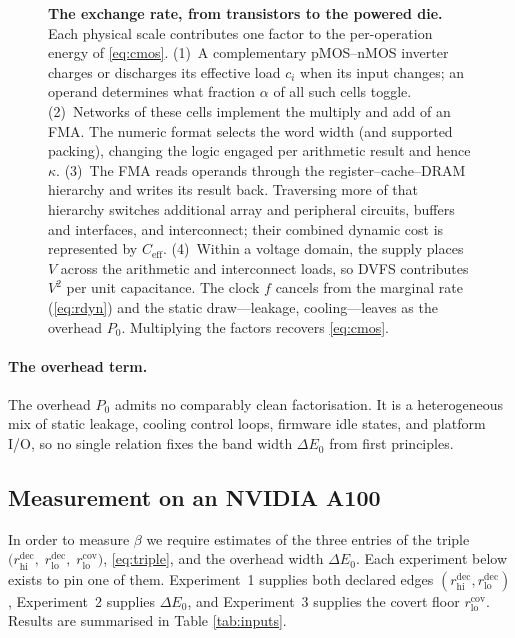 \documentclass{article}
\theoremstyle{plain}
\theoremstyle{definition}
\theoremstyle{remark}
\begin{document}
\begin{figure}[t]
{\begin{tikzpicture}
	\end{tikzpicture}%
	}
	\caption{\textbf{The exchange rate, from transistors to the powered die.}
		Each physical scale contributes one factor to the per-operation energy of
		\cref{eq:cmos}. (1)~A complementary pMOS--nMOS inverter charges or discharges
		its effective load \(c_i\) when its input changes; an operand determines
		what fraction \(\alpha\) of all such cells toggle. (2)~Networks of these
		cells implement the multiply and add of an FMA. The numeric format selects
		the word width (and supported packing), changing the logic engaged per
		arithmetic result and hence \(\kappa\). (3)~The FMA reads operands through
		the register--cache--DRAM hierarchy and writes its result back. Traversing
		more of that hierarchy switches additional array and peripheral circuits,
		buffers and interfaces, and interconnect; their combined dynamic cost is
		represented by \(C_{\mathrm{eff}}\). (4)~Within a voltage domain, the supply places
		\(V\) across the arithmetic and interconnect loads, so DVFS contributes
		\(V^2\) per unit capacitance. The
		clock \(f\) cancels from the marginal rate (\cref{eq:rdyn}) and the static
		draw---leakage, cooling---leaves as the overhead \(P_0\).
		Multiplying the factors recovers \cref{eq:cmos}.}
	\label{fig:exchange-scales}
\end{figure}

\paragraph{The overhead term.}
The overhead $P_0$ admits no comparably
clean factorisation. It is a
heterogeneous mix of static leakage, cooling control loops, firmware idle states,
and platform I/O, so no single relation fixes the band width $\Delta E_0$ from
first principles.

\subsection{Measurement on an NVIDIA A100}
\label{sec:empirical-measurements}
In order to measure $\beta$ we require estimates of the three entries of the triple $	\bigl(r_{\mathrm{hi}}^{\mathrm{dec}},\;r_{\mathrm{lo}}^{\mathrm{dec}},\;
	r_{\mathrm{lo}}^{\mathrm{cov}}\bigr)$, 
\cref{eq:triple}, and the overhead width $\Delta E_0$. Each experiment below
exists to pin one of them. Experiment~1 supplies both declared edges
$(r_{\mathrm{hi}}^{\mathrm{dec}}, r_{\mathrm{lo}}^{\mathrm{dec}})$,
Experiment~2 supplies $\Delta E_0$, and Experiment~3 supplies the covert floor
$r_{\mathrm{lo}}^{\mathrm{cov}}$. Results are summarised in Table \ref{tab:inputs}.
\end{document}
